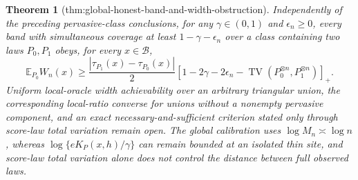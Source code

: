 \documentclass{article}
\newtheorem{theorem}{Theorem}
\begin{document}
\begin{theorem}[thm:global-honest-band-and-width-obstruction]
Independently of the preceding pervasive-class conclusions, for any \(\gamma\in(0,1)\) and \(\epsilon_n\ge0\), every band with simultaneous coverage at least \(1-\gamma-\epsilon_n\) over a class containing two laws \(P_0,P_1\) obeys, for every \(x\in\mathcal B\),
\[
 \mathbb E_{P_0}W_n(x)\ge\frac{|\tau_{P_1}(x)-\tau_{P_0}(x)|}{2}
 \left[1-2\gamma-2\epsilon_n-
 \operatorname{TV}(P_0^{\otimes n},P_1^{\otimes n})\right]_+.
\]
Uniform local-oracle width achievability over an arbitrary triangular union, the corresponding local-ratio converse for unions without a nonempty pervasive component, and an exact necessary-and-sufficient criterion stated only through score-law total variation remain open. The global calibration uses \(\log M_n\asymp\log n\), whereas \(\log\{eK_P(x,h)/\gamma\}\) can remain bounded at an isolated thin site, and score-law total variation alone does not control the distance between full observed laws.
\end{theorem}
\end{document}
